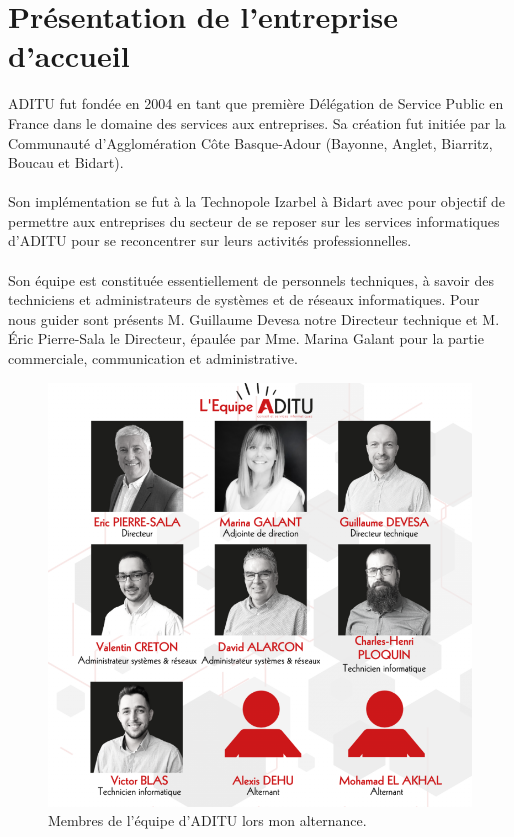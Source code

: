 \begin{sloppypar}
\newpage

\section{Présentation de l'entreprise d'accueil}
ADITU fut fondée en 2004 en tant que première Délégation de Service Public en France dans le domaine des services aux entreprises. Sa création fut initiée par la Communauté d’Agglomération Côte Basque-Adour (Bayonne, Anglet, Biarritz, Boucau et Bidart).
\\ \\
Son implémentation se fut à la Technopole Izarbel à Bidart avec pour objectif de permettre aux entreprises du secteur de se reposer sur les services informatiques d'ADITU pour se reconcentrer sur leurs activités professionnelles.
\\ \\
Son équipe est constituée essentiellement de personnels techniques, à savoir des techniciens et administrateurs de systèmes et de réseaux informatiques. Pour nous guider sont présents M. Guillaume Devesa notre Directeur technique et M. Éric Pierre-Sala le Directeur, épaulée par Mme. Marina Galant pour la partie commerciale, communication et administrative.
\begin{figure}[H] %
  \centering
  \captionsetup{justification=centering}
  \includegraphics[scale = 0.5]{images/equipe_aditu.png}
  \caption{Membres de l'équipe d'ADITU lors mon alternance.}  
  \label{fig:aditu_members} %
\end{figure}


\end{sloppypar}
